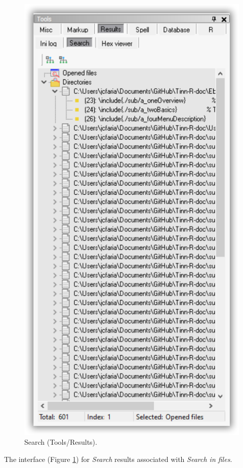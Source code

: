 \begin{figure}[H]
  \includegraphics[scale=0.35]{./res/tools_results_search.png}
  \caption{Search (Tools/Results).}
  \label{fig:tools_results_search}
\end{figure}

The interface
(Figure \ref{fig:tools_results_search})
for \textit{Search} results associated with \textit{Search in files}.

